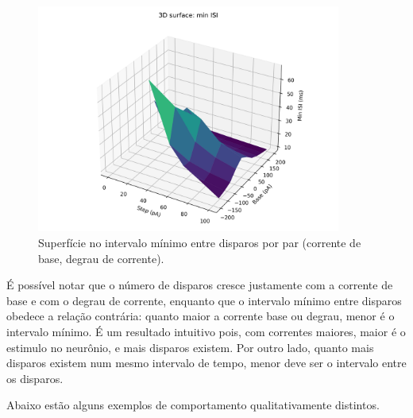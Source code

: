 \documentclass[english,11pt,a4paper]{article}
\begin{document}
	\begin{figure}[H]
		\centering
		\includegraphics[width=10cm]{../figures/ex_2b_minISI_surface.png}	
		\caption{Superfície no intervalo mínimo entre disparos por par (corrente de base, degrau de corrente).}
	\end{figure}
	
	É possível notar que o número de disparos cresce justamente com a corrente de base e com o degrau de corrente, enquanto que o intervalo mínimo entre disparos obedece a relação contrária: quanto maior a corrente base ou degrau, menor é o intervalo mínimo. É um resultado intuitivo pois, com correntes maiores, maior é o estimulo no neurônio, e mais disparos existem. Por outro lado, quanto mais disparos existem num mesmo intervalo de tempo, menor deve ser o intervalo entre os disparos.
	
	Abaixo estão alguns exemplos de comportamento qualitativamente distintos.
	
\end{document}
